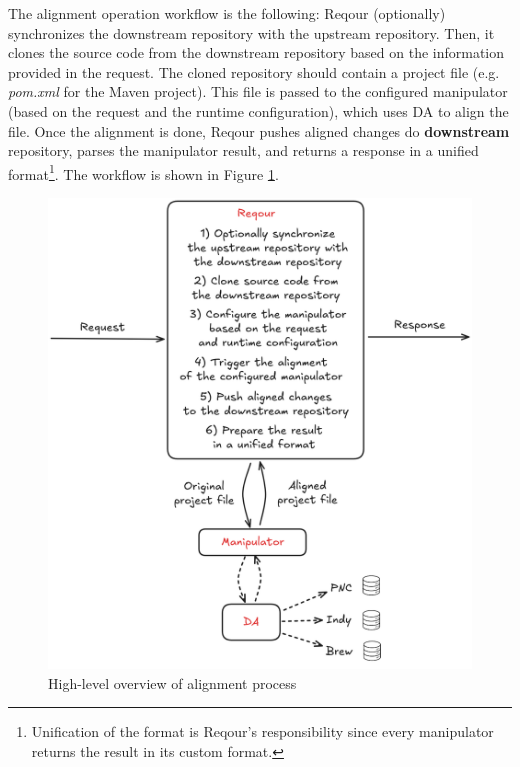 \documentclass[../main.tex]{subfiles}
\begin{document}
The alignment operation workflow is the following: Reqour (optionally) synchronizes the downstream repository with the upstream repository. Then, it clones the source code from the downstream repository based on the information provided in the request. The cloned repository should contain a project file (e.g. \textit{pom.xml} for the Maven project). This file is passed to the configured manipulator (based on the request and the runtime configuration), which uses DA to align the file. Once the alignment is done, Reqour pushes aligned changes do \textbf{downstream} repository, parses the manipulator result, and returns a response in a unified format\footnote{Unification of the format is Reqour's responsibility since every manipulator returns the result in its custom format.}.
The workflow is shown in Figure \ref{fig:alignment-process}.

\begin{figure}
  \begin{center}
    \includegraphics[width=\textwidth]{images/alignment-process.png}
  \end{center}
  \caption{High-level overview of alignment process}
  \label{fig:alignment-process}
\end{figure}
\end{document}
